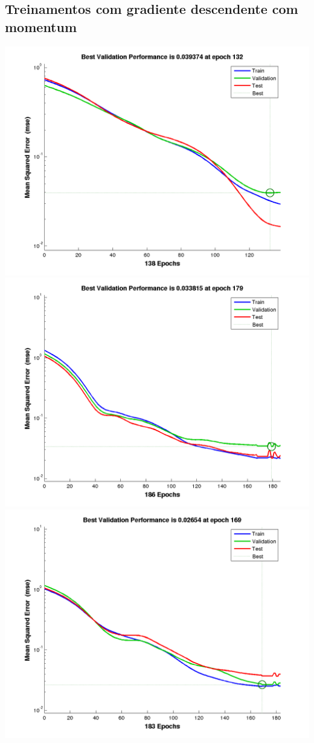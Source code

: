 \documentclass[a4paper]{article}
\begin{document}
\subsection*{Treinamentos com gradiente descendente com momentum}
\includegraphics[width=\textwidth]{tr1m.png}
\includegraphics[width=\textwidth]{tr2m.png}
\includegraphics[width=\textwidth]{tr3m.png}
\end{document}
